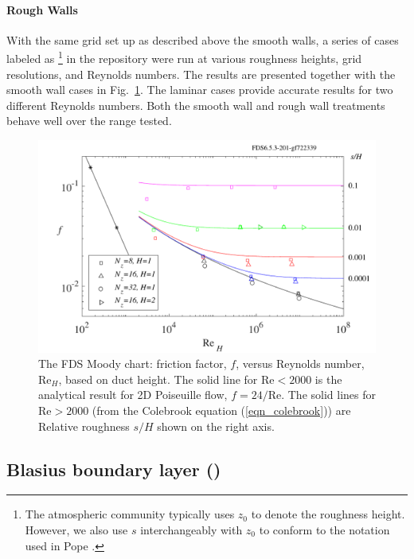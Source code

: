 \documentclass[11pt]{book}
\begin{document}
\paragraph{Rough Walls}

With the same grid set up as described above the smooth walls, a series of cases labeled as \footnote{The atmospheric community typically uses $z_0$ to denote the roughness height. However, we also use $s$ interchangeably with $z_0$ to conform to the notation used in Pope \cite{Pope:2000}.} in the repository \cite{FDS-SMV_repository} were run at various roughness heights, grid resolutions, and Reynolds numbers. The results are presented together with the smooth wall cases in Fig.~\ref{fig_fds_moody_chart}. The laminar cases provide accurate results for two different Reynolds numbers. Both the smooth wall and rough wall treatments behave well over the range tested.

\begin{figure}
   \begin{center}
      \includegraphics[width=5.5in]{SCRIPT_FIGURES/fds_moody_chart}
      \caption[FDS Moody chart]{\label{fig_fds_moody_chart} The FDS Moody chart: friction factor, $f$, versus Reynolds number, Re$_H$, based on duct height. The solid line for $\mbox{Re} < 2000$ is the analytical result for 2D Poiseuille flow, $f=24/\mbox{Re}$. The solid lines for $\mbox{Re}>2000$ (from the Colebrook equation (\ref{eqn_colebrook})) are Relative roughness $s/H$ shown on the right axis.}
   \end{center}
\end{figure}

\clearpage

\subsection{Blasius boundary layer (\texorpdfstring{}{blasius})}
\end{document}
